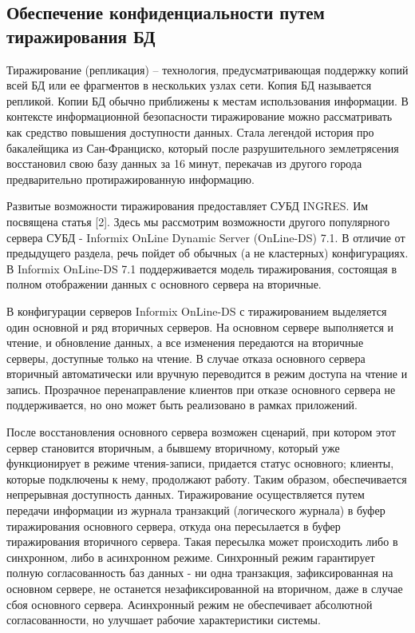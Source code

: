 \subsection{Обеспечение конфиденциальности путем тиражирования БД}

Тиражирование (репликация) – технология, предусматривающая поддержку
копий всей БД или ее фрагментов в нескольких узлах сети. Копия БД называется
репликой. Копии БД обычно приближены к местам использования информации.
В контексте информационной безопасности тиражирование можно рассматривать как средство повышения доступности данных. Стала легендой история про бакалейщика из Сан-Франциско, который после разрушительного землетрясения восстановил свою базу данных за 16 минут, перекачав из другого города предварительно протиражированную информацию.

Развитые возможности тиражирования предоставляет СУБД INGRES. Им посвящена статья [2]. Здесь мы рассмотрим возможности другого популярного сервера СУБД - Informix OnLine Dynamic Server (OnLine-DS) 7.1. В отличие от предыдущего раздела, речь пойдет об обычных (а не кластерных) конфигурациях.
В Informix OnLine-DS 7.1 поддерживается модель тиражирования, состоящая в полном отображении данных с основного сервера на вторичные.

В конфигурации серверов Informix OnLine-DS с тиражированием выделяется один основной и ряд вторичных серверов. На основном сервере выполняется и чтение, и обновление данных, а все изменения передаются на вторичные серверы, доступные только на чтение. В случае отказа основного сервера вторичный автоматически или вручную переводится в режим доступа на чтение и запись. Прозрачное перенаправление клиентов при отказе основного сервера не поддерживается, но оно может быть реализовано в рамках приложений.

После восстановления основного сервера возможен сценарий, при котором этот сервер становится вторичным, а бывшему вторичному, который уже функционирует в режиме чтения-записи, придается статус основного; клиенты, которые подключены к нему, продолжают работу. Таким образом, обеспечивается непрерывная доступность данных.
Тиражирование осуществляется путем передачи информации из журнала транзакций (логического журнала) в буфер тиражирования основного сервера, откуда она пересылается в буфер тиражирования вторичного сервера. Такая пересылка может происходить либо в синхронном, либо в асинхронном режиме. Синхронный режим гарантирует полную согласованность баз данных - ни одна транзакция, зафиксированная на основном сервере, не останется незафиксированной на вторичном, даже в случае сбоя основного сервера. Асинхронный режим не обеспечивает абсолютной согласованности, но улучшает рабочие характеристики системы.

